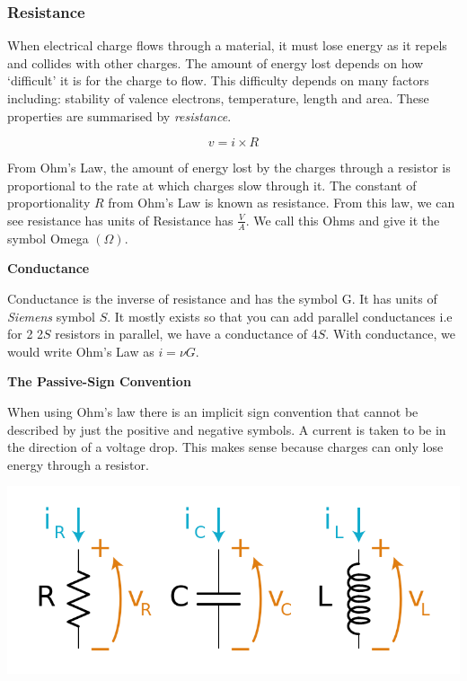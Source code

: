\documentclass[12pt]{article}
\begin{document}
\subsubsection{Resistance}

When electrical charge flows through a material, it must lose energy as it repels and collides with other charges.
The amount of energy lost depends on how `difficult' it is for the charge to flow. 
This difficulty depends on many factors including: stability of valence electrons, temperature, length and area.
These properties are summarised by \textit{resistance}.

\begin{equation*}
  v = i \times R 
\end{equation*}


From Ohm's Law, the amount of energy lost by the charges through a resistor is proportional to the rate at which charges slow through it.
The constant of proportionality $R$ from Ohm's Law is known as resistance. 
From this law, we can see resistance has units of Resistance has $\frac{V}{A}$.
We call this Ohms and give it the symbol Omega $(\Omega)$.

\begin{theorem*}
  \textbf{Conductance}

  Conductance is the inverse of resistance and has the symbol G. 
  It has units of \textit{Siemens} symbol $S$.
  It mostly exists so that you can add parallel conductances i.e for 2 2$S$ resistors in parallel, we have a conductance of 4$S$.
  With conductance, we would write Ohm's Law as $i=\nu G$.
\end{theorem*}

\begin{definition*}
  \textbf{The Passive-Sign Convention}

  When using Ohm's law there is an implicit sign convention that cannot be described by just the positive and negative symbols.
  A current is taken to be in the direction of a voltage drop. 
  This makes sense because charges can only lose energy through a resistor.
\end{definition*}

\begin{marginfigure}
  \vspace{-1cm}

  \includegraphics[scale=0.2]{convention}
\end{marginfigure}
\end{document}
